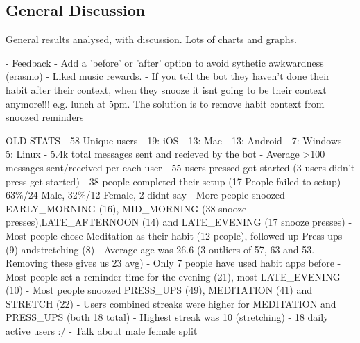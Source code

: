 \subsection{General Discussion}
General results analysed, with discussion. Lots of charts and graphs.

- Feedback
  - Add a 'before' or 'after' option to avoid sythetic awkwardness (erasmo)
  - Liked music rewards.
  - If you tell the bot they haven't done their habit after their context, when they snooze it isnt going to be their context anymore!!! e.g. lunch at 5pm. The solution is to remove habit context from snoozed reminders



\newline
OLD STATS
- 58 Unique users\newline
  - 19: iOS\newline
  - 13: Mac\newline
  - 13: Android\newline
  - 7: Windows\newline
  - 5: Linux\newline
- 5.4k total messages sent and recieved by the bot\newline
- Average >100 messages sent/received per each user\newline
- 55 users pressed got started (3 users didn't press get started)\newline
- 38 people completed their setup (17 People failed to setup)\newline
- 63\%/24 Male, 32\%/12 Female, 2 didnt say\newline
- More people snoozed EARLY\_MORNING (16), MID\_MORNING (38 snooze presses),\newline LATE\_AFTERNOON (14) and LATE\_EVENING (17 snooze presses)
- Most people chose Meditation as their habit (12 people), followed up Press ups (9) and\newline stretching (8)
- Average age was 26.6 (3 outliers of 57, 63 and 53. Removing these gives us 23 avg)\newline
- Only 7 people have used habit apps before\newline
- Most people set a reminder time for the evening (21), most LATE\_EVENING (10)\newline
- Most people snoozed PRESS\_UPS (49), MEDITATION (41) and STRETCH (22)\newline
- Users combined streaks were higher for MEDITATION and PRESS\_UPS (both 18 total)\newline
- Highest streak was 10 (stretching)\newline
- 18 daily active users :/\newline
- Talk about male female split\newline

